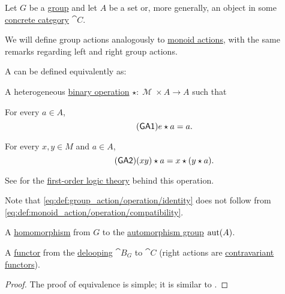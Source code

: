 \begin{definition}\label{def:group_action}
  Let \( G \) be a \hyperref[def:group]{group} and let \( A \) be a set or, more generally, an object in some \hyperref[def:concrete_category]{concrete category} \( \cat{C} \).

  We will define group actions analogously to \hyperref[def:monoid_action]{monoid actions}, with the same remarks regarding left and right group actions.

  A  can be defined equivalently as:
  \begin{thmenum}
     A heterogeneous \hyperref[def:magma]{binary operation} \( \star: \mscrM \times A \to A \) such that
    \begin{thmenum}
       For every \( a \in A \),
      \begin{equation}\label{eq:def:group_action/operation/identity}\tag{\logic{GA1}}
        e \star a = a.
      \end{equation}

       For every \( x, y \in M \) and \( a \in A \),
      \begin{equation}\label{eq:def:monoid_action/operation/compatibility}\tag{\logic{GA2}}
        (xy) \star a = x \star (y \star a).
      \end{equation}
    \end{thmenum}

    See  for the \hyperref[def:first_order_theory]{first-order logic theory} behind this operation.

    Note that \eqref{eq:def:group_action/operation/identity} does not follow from \eqref{eq:def:monoid_action/operation/compatibility}.

     A \hyperref[def:group/homomorphism]{homomorphism} from \( G \) to the \hyperref[def:automorphism_group]{automorphism group} \( \operatorname{aut}(A) \).

     A \hyperref[def:functor]{functor} from the \hyperref[def:monoid_delooping]{delooping} \( \cat{B}_G \) to \( \cat{C} \) (right actions are \hyperref[rem:contravariant_functor]{contravariant functors}).
  \end{thmenum}
\end{definition}
\begin{proof}
  The proof of equivalence is simple; it is similar to .
\end{proof}

